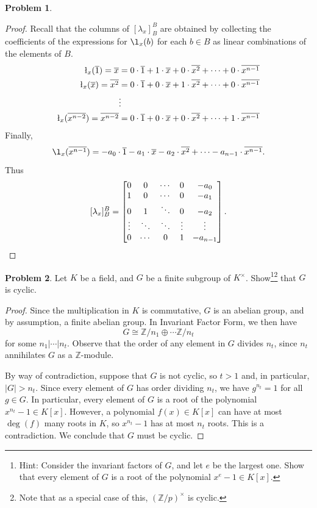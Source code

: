 \documentclass[11pt]{article}
\newcommand{\Z}{\mathbb{Z}}
\newcommand{\ov}[1]{\overline{#1}}
\def\ov#1{\overline{#1}}
\theoremstyle{definition}
\newtheorem{problem}{Problem}
\begin{document}
\begin{problem}
\begin{enumerate}[(a)]
\begin{proof} 
Recall that the columns of $[\lambda_x]_B^B$ are obtained by collecting the coefficients of the expressions for $\l_x(b)$ for each $b\in B$ as linear combinations of the elements of $B$.
\begin{eqnarray*}
\l_x(\ov{1}) = \ov{x} & =0\cdot \ov{1}+ 1\cdot \ov{x} +0\cdot \ov{x^2}+\dots +0\cdot \ov{x^{n-1}}\\
\l_x(\ov{x}) = \ov{x^2} & = 0\cdot \ov{1}+ 0\cdot \ov{x} +1\cdot \ov{x^2}+\dots +0\cdot \ov{x^{n-1}}\\
& \vdots\\
\l_x(\ov{x^{n-2}}) = \ov{x^{n-2}} & = 0\cdot \ov{1}+ 0\cdot \ov{x} +0\cdot \ov{x^2}+\dots +1\cdot \ov{x^{n-1}}
\end{eqnarray*}
Finally,
$$\l_x(\ov{x^{n-1}}) = -a_0\cdot \ov{1}-a_1\cdot \ov{x} -a_2\cdot \ov{x^2}+\dots -a_{n-1}\cdot \ov{x^{n-1}}.$$
Thus 
$$[\lambda_x]_B^B=
\begin{bmatrix}
0 & 0 &\cdots & 0 & -a_0 \\
1 & 0 & \cdots & 0 & -a_1 \\
0 & 1 & \ddots & 0 & -a_2 \\
\vdots & \ddots & \ddots & \vdots & \vdots \\
0 & \cdots & 0 & 1 & -a_{n-1} \\
\end{bmatrix}.\qedhere$$
\end{proof}

\end{enumerate}	
\end{problem}

\newpage

\begin{problem}
Let $K$ be a field, and $G$ be a finite subgroup of $K^\times$. Show\footnote{Hint: Consider the invariant factors of $G$, and let $e$ be the largest one. Show that every element of $G$ is a root of the polynomial $x^e-1 \in K[x]$.}\footnote{Note that as a special case of this, $(\Z/p)^\times$ is cyclic.} that $G$ is cyclic.
\end{problem}

\begin{proof} Since the multiplication in $K$ is commutative, $G$ is an abelian group, and by assumption, a finite abelian group. In Invariant Factor Form, we then have
\[ G \cong \Z/{n_1} \oplus \cdots \Z/{n_t}\]
for some $n_1 | \cdots | n_t$. Observe that the order of any element in $G$ divides $n_t$, since $n_t$ annihilates $G$ as a $\Z$-module.

By way of contradiction, suppose that $G$ is not cyclic, so $t>1$ and, in particular, $|G|> n_t$. Since every element of $G$ has order dividing $n_t$, we have $g^{n_t}=1$ for all $g\in G$. In particular, every element of $G$ is a root of the polynomial $x^{n_t}-1\in K[x]$. However, a polynomial $f(x)\in K[x]$ can have at most $\deg(f)$ many roots in $K$, so $x^{n_t}-1$ has at most $n_t$ roots. This is a contradiction. We conclude that $G$ must be cyclic.
\end{proof}
\end{document}

